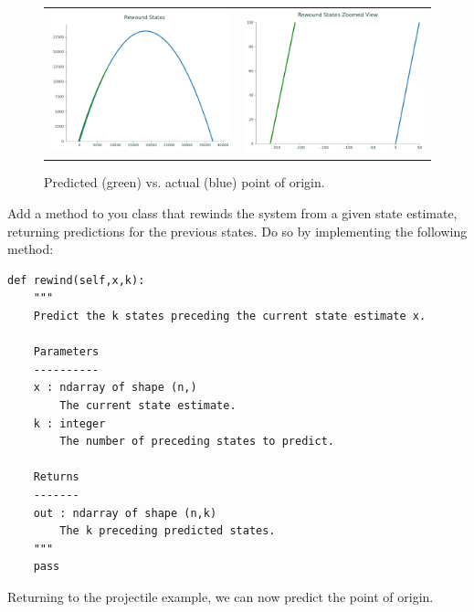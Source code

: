 \begin{figure}[htb]
    \centering
    \begin{tabular}{cc}
    \includegraphics[width=.45\textwidth]{figures/origin_macro} &
    \includegraphics[width=.45\textwidth]{figures/origin_micro}
    \end{tabular}
    \caption{Predicted (green) vs. actual (blue) point of origin.}
    \label{fig:origin}
\end{figure}

\begin{problem}
Add a method to you class that rewinds the system from a given state estimate, returning predictions for the previous states.
Do so by implementing the following method:
\begin{lstlisting}
def rewind(self,x,k):
    """
    Predict the k states preceding the current state estimate x.

    Parameters
    ----------
    x : ndarray of shape (n,)
        The current state estimate.
    k : integer
        The number of preceding states to predict.

    Returns
    -------
    out : ndarray of shape (n,k)
        The k preceding predicted states.
    """
    pass
\end{lstlisting}
\end{problem}

Returning to the projectile example, we can now predict the point of origin.

